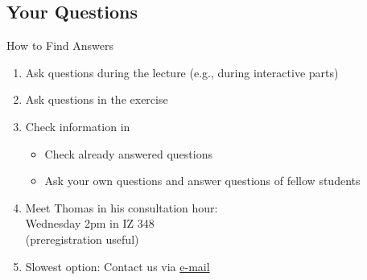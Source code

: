 \subsection{Your Questions}
\begin{frame}{\insertsubsection}
	\begin{fancycolumns}
		\begin{definition}{How to Find Answers}
			\begin{enumerate}
				\item<+-> Ask questions during the lecture (e.g., during interactive parts)
				\item<+-> Ask questions in the exercise
				\item<+-> Check information in \StudIP
				\begin{itemize}
					\item Check already answered questions
					\item Ask your own questions and answer questions of fellow students
				\end{itemize}
				\item<+-> Meet Thomas in his consultation hour:\\
				Wednesday 2pm in IZ 348\\(preregistration useful)
				\item<+-> Slowest option: Contact us via  \href{mailto:chico.sundermann@tu-braunschweig.de?cc=raphael.dunkel@tu-braunschweig.de,thomas.thuem@tu-braunschweig.de&subject=[SE2]}{e-mail}
			\end{enumerate}
		\end{definition}
		\nextcolumn
	\end{fancycolumns}
\end{frame}
